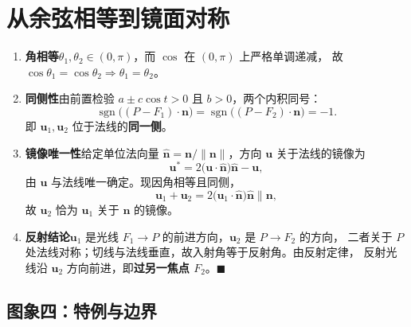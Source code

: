 \documentclass[11pt]{ctexart}
\newcommand{\uu}{\mathbf{u}}
\begin{document}
\section{从余弦相等到镜面对称}

\begin{enumerate}
\item \textbf{角相等}\quad $\theta_{1},\theta_{2}\in(0,\pi)$，而 $\cos$ 在 $(0,\pi)$ 上严格单调递减，
故 $\cos\theta_{1}=\cos\theta_{2}\Rightarrow\theta_{1}=\theta_{2}$。

\item \textbf{同侧性}\quad 由前置检验 $a\pm c\cos t>0$ 且 $b>0$，两个内积同号：
\[
\operatorname{sgn}\bigl((P-F_{1})\cdot\mathbf{n}\bigr)
=\operatorname{sgn}\bigl((P-F_{2})\cdot\mathbf{n}\bigr)=-1 .
\]
即 $\uu_{1},\uu_{2}$ 位于法线的\textbf{同一侧}。

\item \textbf{镜像唯一性}\quad 给定单位法向量 $\hat{\mathbf{n}}=\mathbf{n}/\|\mathbf{n}\|$，方向 $\uu$ 关于法线的镜像为
\[
\uu^{\ast}=2\bigl(\uu\cdot\hat{\mathbf{n}}\bigr)\hat{\mathbf{n}}-\uu ,
\]
由 $\uu$ 与法线唯一确定。现因角相等且同侧，
\[
\mathbf{u}_{1}+\mathbf{u}_{2}=2\bigl(\mathbf{u}_{1}\cdot\hat{\mathbf{n}}\bigr)\hat{\mathbf{n}}\parallel\mathbf{n},
\]
故 $\uu_{2}$ 恰为 $\uu_{1}$ 关于 $\mathbf{n}$ 的镜像。

\item \textbf{反射结论}\quad $\uu_{1}$ 是光线 $F_{1}\to P$ 的前进方向，$\uu_{2}$ 是 $P\to F_{2}$ 的方向，
二者关于 $P$ 处法线对称；切线与法线垂直，故入射角等于反射角。由反射定律，
反射光线沿 $\uu_{2}$ 方向前进，即\textbf{过另一焦点 $F_{2}$}。$\blacksquare$
\end{enumerate}

\subsection{图象四：特例与边界}
\end{document}
